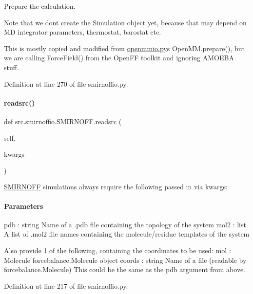 Prepare the calculation. 

Note that we don\textquotesingle{}t create the Simulation object yet, because that may depend on MD integrator parameters, thermostat, barostat etc.

This is mostly copied and modified from \hyperlink{openmmio_8py}{openmmio.\+py}\textquotesingle{}s Open\+M\+M.\+prepare(), but we are calling Force\+Field() from the Open\+FF toolkit and ignoring A\+M\+O\+E\+BA stuff. 

Definition at line 270 of file smirnoffio.\+py.

\mbox{\label{classsrc_1_1smirnoffio_1_1SMIRNOFF_a3429bb5ae44273ea911ce3889df8990e}} 
\paragraph{\texorpdfstring{readsrc()}{readsrc()}}
{\footnotesize\ttfamily def src.\+smirnoffio.\+S\+M\+I\+R\+N\+O\+F\+F.\+readsrc (\begin{DoxyParamCaption}\item[{}]{self,  }\item[{}]{kwargs }\end{DoxyParamCaption})}



\hyperlink{classsrc_1_1smirnoffio_1_1SMIRNOFF}{S\+M\+I\+R\+N\+O\+FF} simulations always require the following passed in via kwargs\+: 

\paragraph*{Parameters }

pdb \+: string Name of a .pdb file containing the topology of the system mol2 \+: list A list of .mol2 file names containing the molecule/residue templates of the system

Also provide 1 of the following, containing the coordinates to be used\+: mol \+: Molecule forcebalance.\+Molecule object coords \+: string Name of a file (readable by forcebalance.\+Molecule) This could be the same as the pdb argument from above. 

Definition at line 217 of file smirnoffio.\+py.


